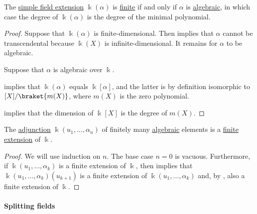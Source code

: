 \begin{proposition}\label{thm:simple_extension_dimension}
  The \hyperref[def:simple_field_extension]{simple field extension} \( \Bbbk(\alpha) \) is \hyperref[def:field_extension_degree]{finite} if and only if \( \alpha \) is \hyperref[def:algebraic_element]{algebraic}, in which case the degree of \( \Bbbk(\alpha) \) is the degree of the minimal polynomial.
\end{proposition}
\begin{proof}
  \SufficiencySubProof Suppose that \( \Bbbk(\alpha) \) is finite-dimensional. Then  implies that \( \alpha \) cannot be transcendental because \( \Bbbk(X) \) is infinite-dimensional. It remains for \( \alpha \) to be algebraic.

  \NecessitySubProof Suppose that \( \alpha \) is algebraic over \( \Bbbk \).

   implies that \( \Bbbk(\alpha) \) equals \( \Bbbk[\alpha] \), and the latter is by definition isomorphic to \( \Bbbk[X] / \braket{ m(X) } \), where \( m(X) \) is the zero polynomial.

   implies that the dimension of \( \Bbbk[X] \) is the degree of \( m(X) \).
\end{proof}

\begin{proposition}\label{thm:finite_adjunction_finite_extension}
  The \hyperref[def:field_adjunction]{adjunction} \( \Bbbk(u_1, \ldots, \alpha_n) \) of finitely many \hyperref[def:algebraic_element]{algebraic} elements is a \hyperref[def:field_extension_degree]{finite extension} of \( \Bbbk \).
\end{proposition}
\begin{proof}
  We will use induction on \( n \). The base case \( n = 0 \) is vacuous. Furthermore, if \( \Bbbk(u_1, \ldots, \alpha_k) \) is a finite extension of \( \Bbbk \), then  implies that \( \Bbbk(u_1, \ldots, \alpha_k)(u_{k+1}) \) is a finite extension of \( \Bbbk(u_1, \ldots, \alpha_k) \) and, by , also a finite extension of \( \Bbbk \).
\end{proof}

\paragraph{Splitting fields}

